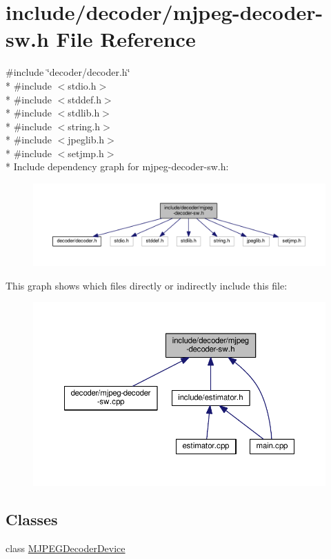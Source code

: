 \hypertarget{mjpeg-decoder-sw_8h}{}\section{include/decoder/mjpeg-\/decoder-\/sw.h File Reference}
\label{mjpeg-decoder-sw_8h}
{\ttfamily \#include \char`\"{}decoder/decoder.\+h\char`\"{}}\\*
{\ttfamily \#include $<$stdio.\+h$>$}\\*
{\ttfamily \#include $<$stddef.\+h$>$}\\*
{\ttfamily \#include $<$stdlib.\+h$>$}\\*
{\ttfamily \#include $<$string.\+h$>$}\\*
{\ttfamily \#include $<$jpeglib.\+h$>$}\\*
{\ttfamily \#include $<$setjmp.\+h$>$}\\*
Include dependency graph for mjpeg-\/decoder-\/sw.h\+:
\nopagebreak
\begin{figure}[H]
\begin{center}
\leavevmode
\includegraphics[width=350pt]{mjpeg-decoder-sw_8h__incl}
\end{center}
\end{figure}
This graph shows which files directly or indirectly include this file\+:
\nopagebreak
\begin{figure}[H]
\begin{center}
\leavevmode
\includegraphics[width=350pt]{mjpeg-decoder-sw_8h__dep__incl}
\end{center}
\end{figure}
\subsection*{Classes}
\begin{DoxyCompactItemize}
\item 
class \hyperlink{classMJPEGDecoderDevice}{M\+J\+P\+E\+G\+Decoder\+Device}
\end{DoxyCompactItemize}

